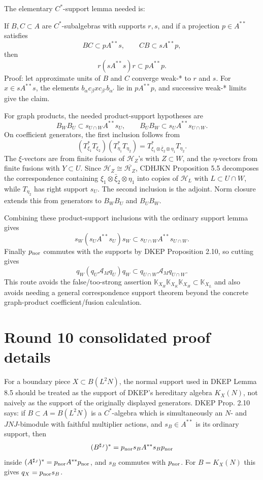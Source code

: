 \documentclass{article}
\begin{document}
The elementary \(C^*\)-support lemma needed is:

If \(B,C\subset A\) are \(C^*\)-subalgebras with supports \(r,s\), and if a
projection \(p\in A^{**}\) satisfies
\[
        BC\subset pA^{**}s,\qquad CB\subset sA^{**}p,
\]
then
\[
        r(sA^{**}s)r\subset pA^{**}p.
\]
Proof: let approximate units of \(B\) and \(C\) converge weak-* to \(r\) and
\(s\).  For \(x\in sA^{**}s\), the elements \(b_\alpha c_\beta x
c_{\beta'}b_{\alpha'}\) lie in \(pA^{**}p\), and successive weak-* limits give
the claim.

For graph products, the needed product-support hypotheses are
\[
        B_WB_U\subset s_{U\cap W}A^{**}s_U,\qquad
        B_UB_W\subset s_UA^{**}s_{U\cap W}.
\]
On coefficient generators, the first inclusion follows from
\[
 (T_{\xi_1}^*T_{\xi_2})(T_{\eta_1}^*T_{\eta_2})
 =
 T_{\xi_1\otimes\bar\xi_2\otimes\eta_1}^{*}T_{\eta_2}.
\]
The \(\xi\)-vectors are from finite fusions of \(\mathcal H_Z\)'s with
\(Z\subset W\), and the \(\eta\)-vectors from finite fusions with \(Y\subset U\).
Since \(\mathcal H_Z\cong\overline{\mathcal H_Z}\), CDHJKN Proposition 5.5
decomposes the correspondence containing
\(\xi_1\otimes\bar\xi_2\otimes\eta_1\) into copies of \(\mathcal H_L\) with
\(L\subset U\cap W\), while \(T_{\eta_2}\) has right support \(s_U\).  The
second inclusion is the adjoint.  Norm closure extends this from generators to
\(B_WB_U\) and \(B_UB_W\).

Combining these product-support inclusions with the ordinary support lemma gives
\[
        s_W(s_UA^{**}s_U)s_W\subset s_{U\cap W}A^{**}s_{U\cap W}.
\]
Finally \(p_{\rm nor}\) commutes with the supports by DKEP Proposition 2.10, so
cutting gives
\[
        q_W(q_U\mathcal A_Mq_U)q_W
        \subset q_{U\cap W}\mathcal A_Mq_{U\cap W}.
\]
This route avoids the false/too-strong assertion
\(\mathbb K_{X_H}\mathbb K_{X_K}\mathbb K_{X_H}\subset \mathbb K_{X_L}\) and
also avoids needing a general correspondence support theorem beyond the
concrete graph-product coefficient/fusion calculation.



\section*{Round 10 consolidated proof details}

For a boundary piece \(X\subset B(L^2N)\), the normal support used in DKEP
Lemma 8.5 should be treated as the support of DKEP's hereditary algebra
\(K_X(N)\), not naively as the support of the originally displayed generators.
DKEP Prop. 2.10 says: if \(B\subset A=B(L^2N)\) is a \(C^*\)-algebra which is
simultaneously an \(N\)- and \(JNJ\)-bimodule with faithful multiplier actions,
and \(s_B\in A^{**}\) is its ordinary support, then
\[
  (B^{\sharp_J})^*=p_{\rm nor}s_BA^{**}s_Bp_{\rm nor}
\]
inside \((A^{\sharp_J})^*=p_{\rm nor}A^{**}p_{\rm nor}\), and \(s_B\) commutes
with \(p_{\rm nor}\).  For \(B=K_X(N)\) this gives \(q_X=p_{\rm nor}s_B\).
\end{document}
